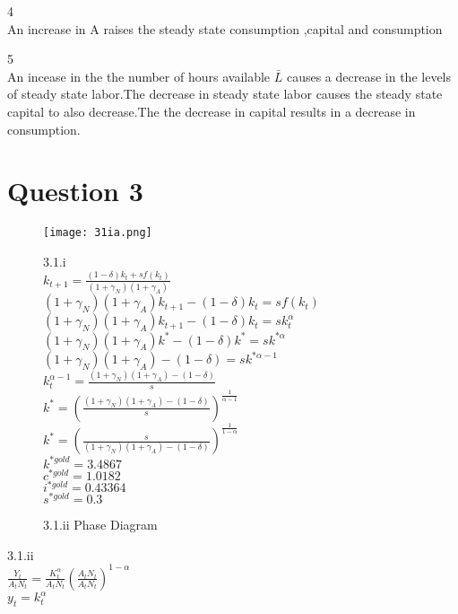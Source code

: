 \documentclass[12pt]{article}
\numberwithin{equation}{subsection} %
\begin{document}
4\\
An increase in A raises the steady state consumption ,capital and consumption

5\\
An incease in the  the number of hours available $\bar{L}$ causes a decrease in the levels of steady state labor.The decrease in  steady state labor causes the steady state capital to also decrease.The  the decrease  in capital results in a decrease in consumption.









\newpage
\section{Question 3}

\begin{figure}[ht!]
\centering
\texttt{[image: 31ia.png]}
\caption{3.1.ii  Phase Diagram\label{overflow}}

3.1.i\\
$k_{t+1}=\frac{(1-\delta)k_{t}+sf(k_{t})}{(1+\gamma_{N})(1+\gamma_{A})}$\\

$(1+\gamma_{N})(1+\gamma_{A})k_{t+1}-(1-\delta)k_{t}=sf(k_{t})$\\

$(1+\gamma_{N})(1+\gamma_{A})k_{t+1}-(1-\delta)k_{t}=sk^{\alpha}_{t}$\\

$(1+\gamma_{N})(1+\gamma_{A})k^{*}-(1-\delta)k^{*}=sk^{* \alpha}$\\

$(1+\gamma_{N})(1+\gamma_{A})-(1-\delta)=sk^{* \alpha-1}$\\

$k^{\alpha-1}_{t}=\frac{(1+\gamma_{N})(1+\gamma_{A})-(1-\delta)}{s}$\\

$k^{*}=\left(\frac{(1+\gamma_{N})(1+\gamma_{A})-(1-\delta)}{s}\right)^{\frac{1}{\alpha-1}}$\\


$k^{*}=\left(\frac{s}{(1+\gamma_{N})(1+\gamma_{A})-(1-\delta)}    \right)^{\frac{1}{1-\alpha}}$\\



$k^{*gold}=3.4867$\\

$c^{*gold}=1.0182$\\

$i^{*gold}=0.43364$\\

$s^{*gold}=0.3$\\

\end{figure}
3.1.ii\\
$\frac{Y_{t}}{A_{t}N_{t}}=\frac{K_{t}^{\alpha}}{A_{t}N_{t}}(\frac{A_{t}N_{t}}{A_{t}N_{t}})^{1-\alpha}$\\
$y_{t}=k_{t}^{\alpha}$\\
\end{document}
